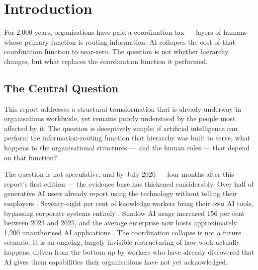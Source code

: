 \chapter{Introduction}
\label{ch:introduction}

\epigraph{For 2,000 years, organisations have paid a coordination tax --- layers of humans whose primary function is routing information. AI collapses the cost of that coordination function to near-zero. The question is not whether hierarchy changes, but what replaces the coordination function it performed.}{}

\section{The Central Question}

This report addresses a structural transformation that is already underway in organisations worldwide, yet remains poorly understood by the people most affected by it. The question is deceptively simple: if artificial intelligence can perform the information-routing function that hierarchy was built to serve, what happens to the organisational structures --- and the human roles --- that depend on that function?

The question is not speculative, and by July 2026 --- four months after this report's first edition --- the evidence base has thickened considerably. Over half of generative AI users already report using the technology without telling their employers \parencite{Mollick2023SecretCyborgs}. Seventy-eight per cent of knowledge workers bring their own AI tools, bypassing corporate systems entirely \parencite{MicrosoftWorkTrend2024}. Shadow AI usage increased 156 per cent between 2023 and 2025, and the average enterprise now hosts approximately 1,200 unauthorised AI applications \parencite{IBM2025}. The coordination collapse is not a future scenario. It is an ongoing, largely invisible restructuring of how work actually happens, driven from the bottom up by workers who have already discovered that AI gives them capabilities their organisations have not yet acknowledged.

